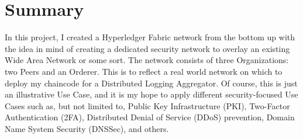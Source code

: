 \section{Summary}
	\hspace{10mm}In this project, I created a Hyperledger Fabric network from the bottom up with the idea in mind of creating a dedicated security network to overlay an existing Wide Area Network or some sort. The network consists of three Organizations: two Peers and an Orderer. This is to reflect a real world network on which to deploy my chaincode for a Distributed Logging Aggregator. Of course, this is just an illustrative Use Case, and it is my hope to apply different security-focused Use Cases such as, but not limited to, Public Key Infrastructure (PKI), Two-Factor Authentication (2FA), Distributed Denial of Service (DDoS) prevention, Domain Name System Security (DNSSec), and others.